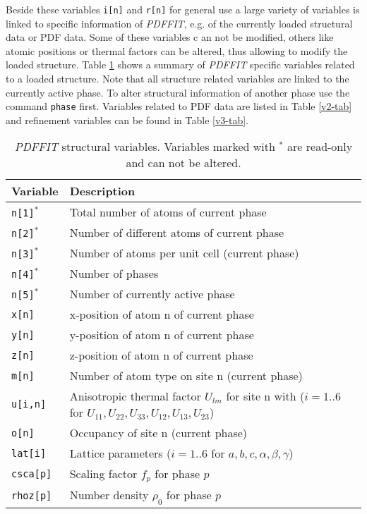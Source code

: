 Beside these variables {\tt i[n]} and {\tt r[n]} for general use a
large variety of variables is linked to specific information of {\it
PDFFIT}, e.g. of the currently loaded structural data or PDF data.
Some of these variables c an not be modified, others like atomic
positions or thermal factors can be altered, thus allowing to modify
the loaded structure. Table \ref{v1-tab} shows a summary of {\it
PDFFIT} specific variables related to a loaded structure. Note that
all structure related variables are linked to the currently active
phase. To alter structural information of another phase use the
command {\tt phase} first. Variables related to PDF data are listed
in Table \ref{v2-tab} and refinement variables can be found in Table
\ref{v3-tab}.

\begin{table}[!htb]
\centering
\begin{tabularx}{\textwidth}{|p{30mm}|X|}
  \hline
  {\bf Variable} & {\bf Description} \\
  \hline \hline
  {\tt n[1]}$^{*}$ & Total number of atoms of current phase \\
  {\tt n[2]}$^{*}$ & Number of different atoms of current phase \\
  {\tt n[3]}$^{*}$ & Number of atoms per unit cell (current phase) \\
  {\tt n[4]}$^{*}$ & Number of phases \\
  {\tt n[5]}$^{*}$ & Number of currently active phase \\
  \hline
  {\tt x[n]}      & x-position of atom n of current phase \\
  {\tt y[n]}      & y-position of atom n of current phase \\
  {\tt z[n]}      & z-position of atom n of current phase \\
  {\tt m[n]}      & Number of atom type on site n (current phase) \\
  {\tt u[i,n]}    & Anisotropic thermal factor $U_{lm}$ for site n with
                    ($i=1..6$ for $U_{11}, U_{22}, U_{33}, U_{12}, U_{13},
                     U_{23}$)\\
  {\tt o[n]}      & Occupancy of site n (current phase) \\

  {\tt lat[i]}    & Lattice parameters ($i=1..6$ for $a,b,c,\alpha,\beta,
                    \gamma$) \\
  {\tt csca[p]}   & Scaling factor $f_{p}$ for phase $p$ \\
  {\tt rhoz[p]}   & Number density $\rho_{0}$ for phase $p$ \\
  \hline
\end{tabularx}
\caption[{\it PDFFIT} structural variables]
        {\label{v1-tab}{\it PDFFIT} structural variables. Variables marked
         with $^{*}$ are read-only and can not be altered.}
\end{table}

